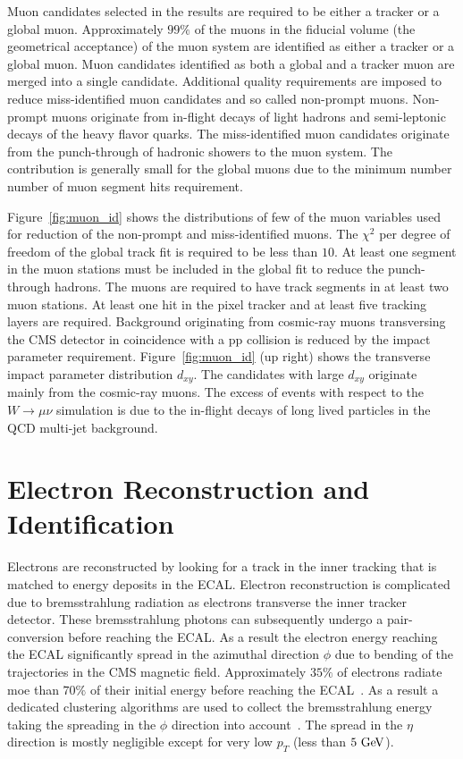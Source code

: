 Muon candidates selected in the results are required to be either a tracker or a global muon. Approximately $99\%$ of the muons in the fiducial volume (the geometrical acceptance) of the muon system are identified as either a tracker or a global muon. Muon candidates identified as both a global and a tracker muon are merged into a single candidate.  Additional quality requirements are imposed to reduce miss-identified muon candidates and so called non-prompt muons. Non-prompt muons originate from in-flight decays of light hadrons and semi-leptonic decays of the heavy flavor quarks. The miss-identified muon candidates originate from the punch-through of hadronic showers to the muon system. The contribution is generally small for the global muons due to the minimum number number of muon segment hits requirement. 

Figure~\ref{fig:muon_id} shows the distributions of few of the muon variables used for reduction of the non-prompt and miss-identified muons. The  $\chi^2$ per degree of freedom of the global track fit is required to be less than $10$. At least one segment in the muon stations must be included in the global fit to reduce the punch-through hadrons. The muons are required to have track segments in at least two muon stations. At least one hit in the pixel tracker and at least five tracking layers are required. Background originating from cosmic-ray muons transversing the CMS detector in coincidence with a pp collision is reduced by the impact parameter requirement. Figure~\ref{fig:muon_id} (up right) shows the transverse impact parameter distribution $d_{xy}$. The candidates with large $d_{xy}$ originate mainly from the cosmic-ray muons.  The excess of events with respect to the $W \rightarrow \mu\nu$ simulation is due to the in-flight decays of long lived particles in the QCD multi-jet background. 

\section{Electron Reconstruction and Identification}

Electrons are reconstructed by looking for a track in the inner tracking that is matched to energy deposits in the ECAL. Electron reconstruction is complicated due to bremsstrahlung radiation as electrons transverse the inner tracker detector. These bremsstrahlung photons can subsequently undergo a pair-conversion before reaching the ECAL. As a result the electron energy reaching the ECAL significantly spread in the azimuthal direction $\phi$ due to bending of the trajectories in the CMS magnetic field. Approximately $35\%$ of electrons radiate moe than $70\%$ of their initial energy before reaching the ECAL~\cite{Chatrchyan:2014fea,Baffioni:2006cd}. As a result a dedicated clustering algorithms are used to collect the bremsstrahlung energy taking the spreading in the $\phi$ direction into account~\cite{Meschi:2001lfa}.  The spread in the $\eta$ direction is mostly negligible except for very low $p_{T}$ (less than $5~\mathrm{Ge\kern -0.1em V}$).    

